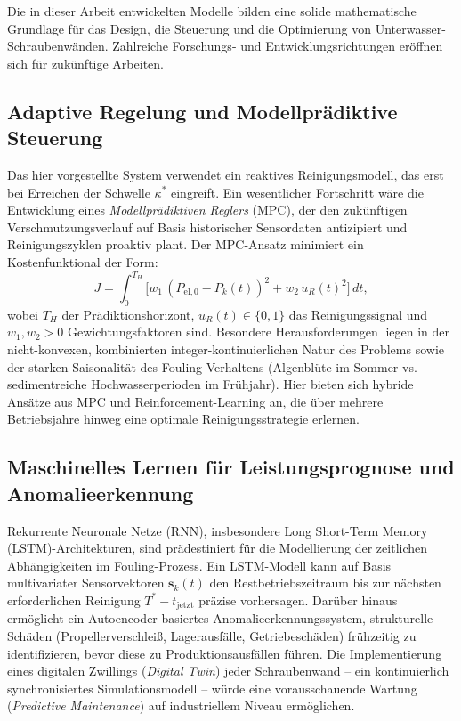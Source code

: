 ﻿\documentclass[a4paper,12pt]{article}
\theoremstyle{definition}
\begin{document}
Die in dieser Arbeit entwickelten Modelle bilden eine solide mathematische Grundlage
für das Design, die Steuerung und die Optimierung von Unterwasser-Schraubenwänden.
Zahlreiche Forschungs- und Entwicklungsrichtungen eröffnen sich für zukünftige Arbeiten.

\subsection{Adaptive Regelung und Modellprädiktive Steuerung}

Das hier vorgestellte System verwendet ein reaktives Reinigungsmodell, das erst
bei Erreichen der Schwelle $\kappa^*$ eingreift. Ein wesentlicher Fortschritt wäre
die Entwicklung eines \emph{Modellprädiktiven Reglers} (MPC), der den zukünftigen
Verschmutzungsverlauf auf Basis historischer Sensordaten antizipiert und Reinigungszyklen
proaktiv plant. Der MPC-Ansatz minimiert ein Kostenfunktional der Form:
\[
  J = \int_0^{T_H} \bigl[ w_1\,(P_{\mathrm{el},0} - P_k(t))^2 + w_2\,u_R(t)^2 \bigr]\,dt,
\]
wobei $T_H$ der Prädiktionshorizont, $u_R(t) \in \{0,1\}$ das Reinigungssignal und
$w_1, w_2 > 0$ Gewichtungsfaktoren sind. Besondere Herausforderungen liegen in der
nicht-konvexen, kombinierten integer-kontinuierlichen Natur des Problems sowie der
starken Saisonalität des Fouling-Verhaltens (Algenblüte im Sommer vs. sedimentreiche
Hochwasserperioden im Frühjahr). Hier bieten sich hybride Ansätze aus MPC und
Reinforcement-Learning an, die über mehrere Betriebsjahre hinweg eine optimale
Reinigungsstrategie erlernen.

\subsection{Maschinelles Lernen für Leistungsprognose und Anomalieerkennung}

Rekurrente Neuronale Netze (RNN), insbesondere Long Short-Term Memory (LSTM)-Architekturen,
sind prädestiniert für die Modellierung der zeitlichen Abhängigkeiten im
Fouling-Prozess. Ein LSTM-Modell kann auf Basis multivariater Sensorvektoren
$\mathbf{s}_k(t)$ den Restbetriebszeitraum bis zur nächsten erforderlichen Reinigung
$T^* - t_{\mathrm{jetzt}}$ präzise vorhersagen. Darüber hinaus ermöglicht ein
Autoencoder-basiertes Anomalieerkennungssystem, strukturelle Schäden (Propellerverschleiß,
Lagerausfälle, Getriebeschäden) frühzeitig zu identifizieren, bevor diese zu
Produktionsausfällen führen. Die Implementierung eines digitalen Zwillings
(\emph{Digital Twin}) jeder Schraubenwand -- ein kontinuierlich synchronisiertes
Simulationsmodell -- würde eine vorausschauende Wartung (\emph{Predictive Maintenance})
auf industriellem Niveau ermöglichen.
\end{document}
